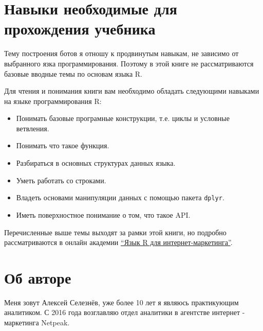 \documentclass[
]{book}
\providecommand{\tightlist}{%
  \setlength{\itemsep}{0pt}\setlength{\parskip}{0pt}}
\begin{document}
\hypertarget{ux43dux430ux432ux44bux43aux438-ux43dux435ux43eux431ux445ux43eux434ux438ux43cux44bux435-ux434ux43bux44f-ux43fux440ux43eux445ux43eux436ux434ux435ux43dux438ux44f-ux443ux447ux435ux431ux43dux438ux43aux430}{%
\section*{Навыки необходимые для прохождения учебника}\label{ux43dux430ux432ux44bux43aux438-ux43dux435ux43eux431ux445ux43eux434ux438ux43cux44bux435-ux434ux43bux44f-ux43fux440ux43eux445ux43eux436ux434ux435ux43dux438ux44f-ux443ux447ux435ux431ux43dux438ux43aux430}}

Тему построения ботов я отношу к продвинутым навыкам, не зависимо от выбранного язка программирования. Поэтому в этой книге не рассматриваются базовые вводные темы по основам языка R.

Для чтения и понимания книги вам необходимо обладать следующими навыками на языке программирования R:

\begin{itemize}
\tightlist
\item
  Понимать базовые програмные конструкции, т.е. циклы и условные ветвления.
\item
  Понимать что такое функция.
\item
  Разбираться в основных структурах данных языка.
\item
  Уметь работать со строками.
\item
  Владеть основами манипуляции данных с помощью пакета \texttt{dplyr}.
\item
  Иметь поверхностное понимание о том, что такое API.
\end{itemize}

Перечисленные выше темы выходят за рамки этой книги, но подробно рассматриваются в онлайн академии \href{https://r-for-marketing.netpeak.net/}{``Язык R для интернет-маркетинга''}.

\hypertarget{ux43eux431-ux430ux432ux442ux43eux440ux435}{%
\section*{Об авторе}\label{ux43eux431-ux430ux432ux442ux43eux440ux435}}

Меня зовут Алексей Селезнёв, уже более 10 лет я являюсь практикующим аналитиком. С 2016 года возглавляю отдел аналитики в агентстве интернет - маркетинга Netpeak.
\end{document}
